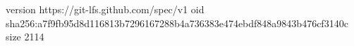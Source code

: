 version https://git-lfs.github.com/spec/v1
oid sha256:a7f9fb95d8d116813b7296167288b4a736383e474ebdf848a9843b476cf3140c
size 2114
